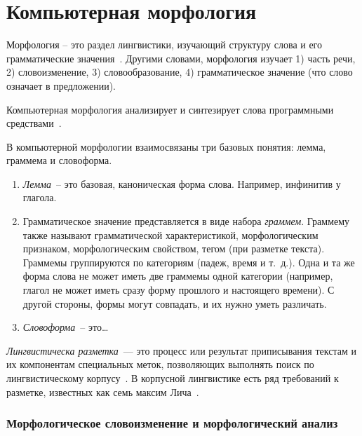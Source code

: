 \section{Компьютерная морфология}\label{sect_review_comp_morphology}

Морфология -- это раздел лингвистики, изучающий структуру слова и его грамматические значения~\cite{MitreninaNikolaevLando2016}. Другими словами, морфология изучает
1) часть речи,
2) словоизменение,
3) словообразование,
4) грамматическое значение (что слово означает в предложении).

Компьютерная морфология анализирует и синтезирует слова программными средствами~\cite{MitreninaNikolaevLando2016}.

В компьютерной морфологии взаимосвязаны три базовых понятия: лемма, граммема и словоформа.
\begin{enumerate}
    \item \emph{Лемма}~-- это базовая, каноническая форма слова.
        Например, инфинитив у глагола.

    \item Грамматическое значение представляется в виде набора \emph{граммем}.
        Граммему также называют грамматической характеристикой,
          морфологическим признаком, морфологическим свойством,
          тегом (при разметке текста).
        Граммемы группируются по категориям (падеж, время и т.~д.).
        Одна и та же форма слова не может иметь две граммемы одной категории
        (например, глагол не может иметь сразу форму прошлого и настоящего времени).
        С другой стороны, формы могут совпадать, и их нужно уметь различать.

    \item \emph{Словоформа}~-- это\ldots {}
\end{enumerate}

\bigskip 
{}
\bigskip 

\emph{Лингвистическа разметка}~--- это процесс или результат 
приписывания текстам и их компонентам специальных меток, 
позволяющих выполнять поиск по лингвистическому корпусу~\cite[415]{Kibrik2019}.
%
В корпусной лингвистике есть ряд требований к разметке, известных как 
семь максим Лича~\cite[415--416]{Kibrik2019}. 


\subsubsection{Морфологическое словоизменение и морфологический анализ}

